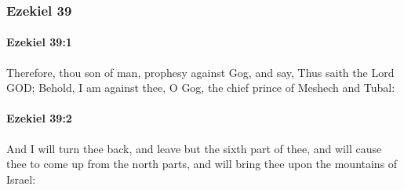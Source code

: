 	\subsubsection{Ezekiel 39} %
		\label{EZEKIEL-39}

		\paragraph{Ezekiel 39:1} %
			\label{EZEKIEL-39-1}

			Therefore, thou son of man, prophesy against Gog, and say, Thus saith the Lord GOD; Behold, I am against thee, O Gog, the chief prince of Meshech and Tubal:


		\paragraph{Ezekiel 39:2} %
			\label{EZEKIEL-39-2}

			And I will turn thee back, and leave but the sixth part of thee, and will cause thee to come up from the north parts, and will bring thee upon the mountains of Israel:

